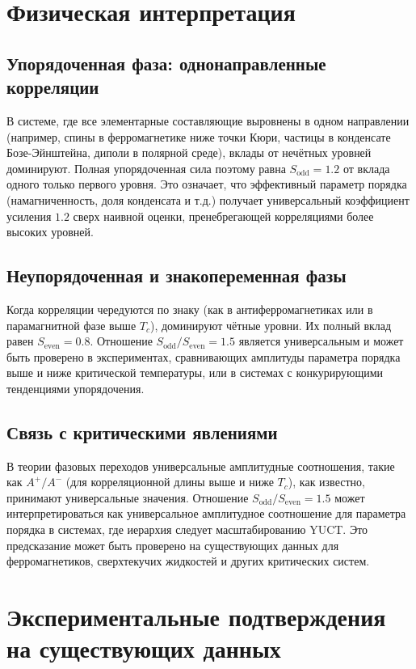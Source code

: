 \documentclass[12pt,a4paper]{article}
\begin{document}
	\section{Физическая интерпретация}
	
	\subsection{Упорядоченная фаза: однонаправленные корреляции}
	В системе, где все элементарные составляющие выровнены в одном направлении (например, спины в ферромагнетике ниже точки Кюри, частицы в конденсате Бозе-Эйнштейна, диполи в полярной среде), вклады от нечётных уровней доминируют. Полная упорядоченная сила поэтому равна \(S_{\text{odd}} = 1.2\) от вклада одного только первого уровня. Это означает, что эффективный параметр порядка (намагниченность, доля конденсата и т.д.) получает универсальный коэффициент усиления \(1.2\) сверх наивной оценки, пренебрегающей корреляциями более высоких уровней.
	
	\subsection{Неупорядоченная и знакопеременная фазы}
	Когда корреляции чередуются по знаку (как в антиферромагнетиках или в парамагнитной фазе выше \(T_c\)), доминируют чётные уровни. Их полный вклад равен \(S_{\text{even}} = 0.8\). Отношение \(S_{\text{odd}}/S_{\text{even}} = 1.5\) является универсальным и может быть проверено в экспериментах, сравнивающих амплитуды параметра порядка выше и ниже критической температуры, или в системах с конкурирующими тенденциями упорядочения.
	
	\subsection{Связь с критическими явлениями}
	В теории фазовых переходов универсальные амплитудные соотношения, такие как \(A^+/A^-\) (для корреляционной длины выше и ниже \(T_c\)), как известно, принимают универсальные значения. Отношение \(S_{\text{odd}}/S_{\text{even}} = 1.5\) может интерпретироваться как универсальное амплитудное соотношение для параметра порядка в системах, где иерархия следует масштабированию YUCT. Это предсказание может быть проверено на существующих данных для ферромагнетиков, сверхтекучих жидкостей и других критических систем.
	
	\section{Экспериментальные подтверждения на существующих данных}
	
\end{document}
